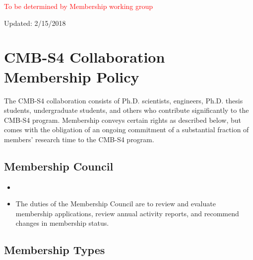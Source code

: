 
\textcolor{red}{To be determined by Membership working group}


Updated:  2/15/2018

\section{CMB-S4 Collaboration Membership Policy}

The CMB-S4 collaboration consists of Ph.D. scientists, engineers, Ph.D. thesis students, undergraduate students, and others who contribute significantly to the CMB-S4 program. Membership conveys certain rights as described below, but comes with the obligation of an ongoing commitment of a substantial fraction of members' research time to the CMB-S4 program.

\vspace{0.2in}
\noindent


\subsection{Membership Council}
\begin{itemize}

\item 

\item The duties of the Membership Council are to review and evaluate membership applications, review annual activity reports, and recommend changes in membership status. 
\end{itemize}

\subsection{Membership Types}

